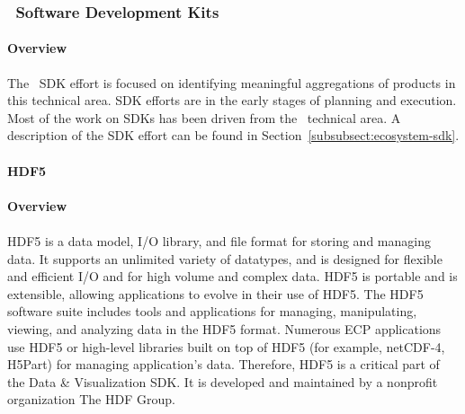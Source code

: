 \subsubsection{ \dataviz\ Software Development Kits} 

\paragraph{Overview} 
The \dataviz\ SDK effort is focused on identifying meaningful aggregations of products in this technical area.  SDK efforts are in the early stages of planning and execution.  Most of the work on SDKs has been driven from the \ecosystem\ technical area.  A description of the SDK effort can be found in Section~\ref{subsubsect:ecosystem-sdk}.
\paragraph{HDF5}
\paragraph{Overview}
\paragraph{}
HDF5 is a data model, I/O library, and file format for storing and managing data. It supports an unlimited variety of datatypes, and is designed for flexible and efficient I/O and for high volume and complex data. HDF5 is portable and is extensible, allowing applications to evolve in their use of HDF5. The HDF5 software suite includes tools and applications for managing, manipulating, viewing, and analyzing data in the HDF5 format. Numerous ECP applications use HDF5 or high-level libraries built on top of HDF5 (for example, netCDF-4, H5Part) for managing application's data. Therefore, HDF5 is a critical part of the Data & Visualization SDK. It is developed and maintained by a nonprofit organization The HDF Group.

